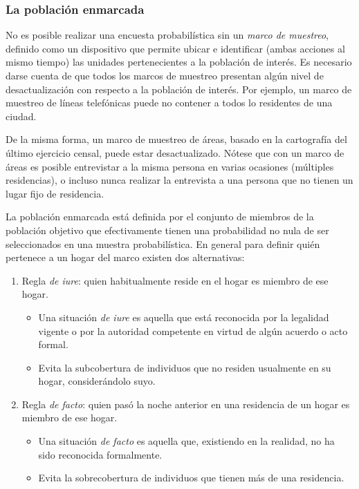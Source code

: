 \documentclass[
  12pt,
  spanish,
]{book}
\providecommand{\tightlist}{%
  \setlength{\itemsep}{0pt}\setlength{\parskip}{0pt}}
\begin{document}
\hypertarget{la-poblaciuxf3n-enmarcada}{%
\subsubsection*{La población enmarcada}\label{la-poblaciuxf3n-enmarcada}}

No es posible realizar una encuesta probabilística sin un \emph{marco de muestreo}, definido como un dispositivo que permite ubicar e identificar (ambas acciones al mismo tiempo) las unidades pertenecientes a la población de interés. Es necesario darse cuenta de que todos los marcos de muestreo presentan algún nivel de desactualización con respecto a la población de interés. Por ejemplo, un marco de muestreo de líneas telefónicas puede no contener a todos lo residentes de una ciudad.

De la misma forma, un marco de muestreo de áreas, basado en la cartografía del último ejercicio censal, puede estar desactualizado. Nótese que con un marco de áreas es posible entrevistar a la misma persona en varias ocasiones (múltiples residencias), o incluso nunca realizar la entrevista a una persona que no tienen un lugar fijo de residencia.

La población enmarcada está definida por el conjunto de miembros de la población objetivo que efectivamente tienen una probabilidad no nula de ser seleccionados en una muestra probabilística. En general para definir quién pertenece a un hogar del marco existen dos alternativas:

\begin{enumerate}
\def\labelenumi{\arabic{enumi}.}
\tightlist
\item
  Regla \emph{de iure}: quien habitualmente reside en el hogar es miembro de ese hogar.

  \begin{itemize}
  \tightlist
  \item
    Una situación \emph{de iure} es aquella que está reconocida por la legalidad vigente o por la autoridad competente en virtud de algún acuerdo o acto formal.
  \item
    Evita la subcobertura de individuos que no residen usualmente en su hogar, considerándolo suyo.
  \end{itemize}
\item
  Regla \emph{de facto}: quien pasó la noche anterior en una residencia de un hogar es miembro de ese hogar.

  \begin{itemize}
  \tightlist
  \item
    Una situación \emph{de facto} es aquella que, existiendo en la realidad, no ha sido reconocida formalmente.
  \item
    Evita la sobrecobertura de individuos que tienen más de una residencia.
  \end{itemize}
\end{enumerate}
\end{document}
